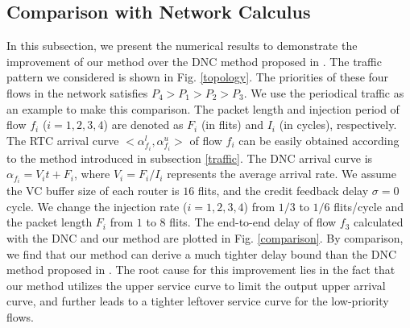 \documentclass[preprint]{elsarticle}
\begin{document}
\subsection{Comparison with Network Calculus}\label{dnccmp}
In this subsection, we present the numerical results to demonstrate the improvement of our method over the DNC method proposed in \cite{Qian489900}. The traffic pattern we considered is shown in Fig. \ref{topology}. The priorities of these four flows in the network satisfies $P_4>P_1>P_2>P_3$. We use the periodical traffic as an example to make this comparison. The packet length and injection period of flow $f_i$ ($i=1,2,3,4$) are denoted as $F_i$ (in flits) and $I_i$ (in cycles), respectively. The RTC arrival curve $<\alpha_{f_i}^l,\alpha_{f_i}^u>$ of flow $f_i$ can be easily obtained according to the method introduced in subsection \ref{traffic}. The DNC arrival curve is $\alpha_{f_i}=V_i t+F_i$, where $V_i=F_i/I_i$ represents the average arrival rate. We assume the VC buffer size of each router is $16$ flits, and the credit feedback delay $\sigma=0$ cycle. We change the injection rate  ($i=1,2,3,4$) from $1/3$ to $1/6$ flits/cycle and the packet length $F_i$ from $1$ to $8$ flits. The end-to-end delay of flow $f_3$ calculated with the DNC and our method are plotted in Fig. \ref{comparison}. By comparison, we find that our method can derive a much tighter delay bound than the DNC method proposed in \cite{Qian489900}. The root cause for this improvement lies in the fact that our method utilizes the upper service curve to limit the output upper arrival curve, and further leads to a tighter leftover service curve for the low-priority flows.
\end{document}

